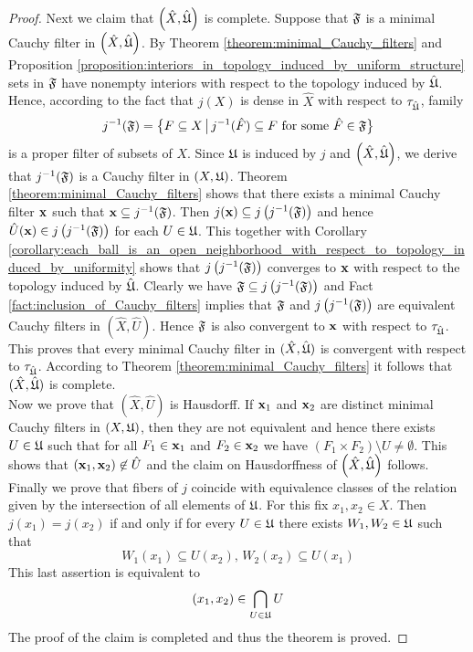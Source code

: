 \begin{proof}
Next we claim that $\left(\hat{X},\hat{{\mathfrak U}}\right)$ is complete. Suppose that ${\mathfrak F}$ is a minimal Cauchy filter in $\left(\hat{X},\hat{{\mathfrak U}}\right)$. By Theorem \ref{theorem:minimal_Cauchy_filters} and Proposition \ref{proposition:interiors_in_topology_induced_by_uniform_structure} sets in ${\mathfrak F}$ have nonempty interiors with respect to the topology induced by $\hat{{\mathfrak U}}$. Hence, according to the fact that $j(X)$ is dense in $\hat{X}$ with respect to $\tau_{\hat{{\mathfrak U}}}$, family
$$j^{-1}({\mathfrak F}) = \big\{F \subseteq X\,\big|\,j^{-1}(\hat{F})\subseteq F\mbox{ for some }\hat{F} \in {\mathfrak F}\big\}$$
is a proper filter of subsets of $X$. Since ${\mathfrak U}$ is induced by $j$ and $\left(\hat{X},\hat{{\mathfrak U}}\right)$, we derive that $j^{-1}({\mathfrak F})$ is a Cauchy filter in $\left(X,{\mathfrak U}\right)$. Theorem \ref{theorem:minimal_Cauchy_filters} shows that there exists a minimal Cauchy filter $\mathbf{x}$ such that $\mathbf{x} \subseteq j^{-1}({\mathfrak F})$. Then $j(\mathbf{x})\subseteq j\left(j^{-1}({\mathfrak F})\right)$ and hence $\hat{U}(\mathbf{x}) \in j\left(j^{-1}({\mathfrak F})\right)$ for each $U \in {\mathfrak U}$. This together with Corollary \ref{corollary:each_ball_is_an_open_neighborhood_with_respect_to_topology_induced_by_uniformity} shows that $j\left(j^{-1}({\mathfrak F})\right)$ converges to $\mathbf{x}$ with respect to the topology induced by $\hat{{\mathfrak U}}$. Clearly we have ${\mathfrak F} \subseteq j\left(j^{-1}({\mathfrak F})\right)$ and Fact \ref{fact:inclusion_of_Cauchy_filters} implies that ${\mathfrak F}$ and $j\left(j^{-1}({\mathfrak F})\right)$ are equivalent Cauchy filters in $\left(\hat{X},\hat{U}\right)$. Hence ${\mathfrak F}$ is also convergent to $\mathbf{x}$ with respect to $\tau_{\hat{{\mathfrak U}}}$. This proves that every minimal Cauchy filter in $(\hat{X},\hat{{\mathfrak U}})$ is convergent with respect to $\tau_{\hat{{\mathfrak U}}}$. According to Theorem \ref{theorem:minimal_Cauchy_filters} it follows that $(\hat{X},\hat{{\mathfrak U}})$ is complete.\\
Now we prove that $\left(\hat{X},\hat{U}\right)$ is Hausdorff. If $\mathbf{x}_1$ and $\mathbf{x}_2$ are distinct minimal Cauchy filters in $\left(X,{\mathfrak U}\right)$, then they are not equivalent and hence there exists $U \in {\mathfrak U}$ such that for all $F_1 \in \mathbf{x}_1$ and $F_2 \in \mathbf{x}_2$ we have $\left(F_1\times F_2\right)\setminus U \neq \emptyset$. This shows that $(\mathbf{x}_1,\mathbf{x}_2) \not \in \hat{U}$ and the claim on Hausdorffness of $\left(\hat{X},\hat{{\mathfrak U}}\right)$ follows.\\
Finally we prove that fibers of $j$ coincide with equivalence classes of the relation given by the intersection of all elements of ${\mathfrak U}$. For this fix $x_1,x_2\in X$. Then $j(x_1) = j(x_2)$ if and only if for every $U\in {\mathfrak U}$ there exists $W_1,W_2\in {\mathfrak U}$ such that 
$$W_1(x_1)\subseteq U(x_2),\,W_2(x_2)\subseteq U(x_1)$$
This last assertion is equivalent to
$$(x_1,x_2) \in \bigcap_{U\in {\mathfrak U}}U$$
The proof of the claim is completed and thus the theorem is proved.
\end{proof}

